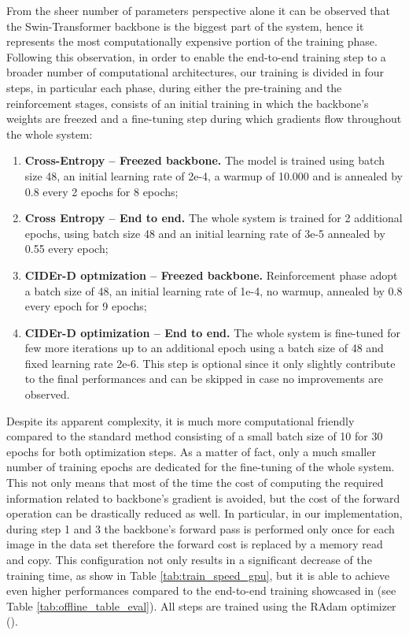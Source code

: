 From the sheer number of parameters perspective alone it can be observed that the Swin-Transformer backbone is the biggest part of the system, hence it represents the most computationally expensive portion of the training phase.
Following this observation, in order to enable the end-to-end training step to a broader number of computational architectures, our training is divided in four steps, in particular each phase, during either the pre-training and the reinforcement stages, consists of an initial training in which the backbone's weights are freezed and a fine-tuning step during which gradients flow throughout the whole system:
\begin{enumerate}
    \item \textbf{Cross-Entropy -- Freezed backbone.} The model is trained using batch size 48, an initial learning rate of 2e-4, a warmup of 10.000 and is annealed by 0.8 every 2 epochs for 8 epochs;
    \item \textbf{Cross Entropy -- End to end.} The whole system is trained for 2 additional epochs, using batch size 48 and an initial learning rate of 3e-5 annealed by 0.55 every epoch;
    \item \textbf{CIDEr-D optmization -- Freezed backbone.} Reinforcement phase adopt a batch size of 48, an initial learning rate of 1e-4, no warmup, annealed by 0.8 every epoch for 9 epochs;
    \item \textbf{CIDEr-D optimization -- End to end.} The whole system is fine-tuned for few more iterations up to an additional epoch using a batch size of 48 and fixed learning rate 2e-6. This step is optional since it only slightly contribute to the final performances and can be skipped in case no improvements are observed.
\end{enumerate}


\noindent
Despite its apparent complexity, it is much more computational friendly compared to the standard method consisting of a small batch size of 10 for 30 epochs for both optimization steps. As a matter of fact, only a much smaller number of training epochs are dedicated for the fine-tuning of the whole system. 
This not only means that most of the time the cost of computing the required information related to  backbone's gradient is avoided, but the cost of the forward operation can be drastically reduced as well. In particular, in our implementation, during step 1 and 3 the backbone's forward pass is performed only once for each image in the data set therefore the forward cost is replaced by a memory read and copy. This configuration not only results in a significant decrease of the training time, as show in Table \ref{tab:train_speed_gpu}, but it is able to achieve even higher performances compared to the end-to-end training showcased in \cite{wang2022end} (see Table \ref{tab:offline_table_eval}). All steps are trained using the RAdam optimizer \cite{liu2019variance} ().




